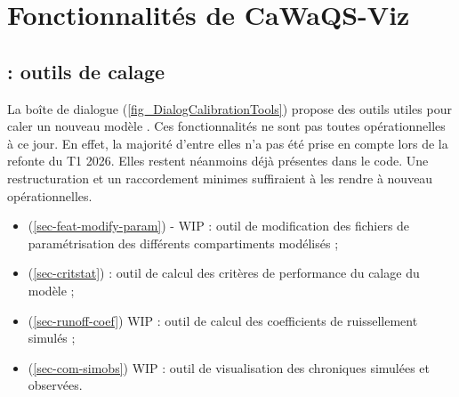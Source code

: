 \chapter{Fonctionnalités de CaWaQS-Viz}
\label{chap-features}

\renewcommand{\headrulewidth}{0.3pt}
\fancyhead[LE]{\thepage} \fancyhead[RE]{\nouppercase{\textbf{\leftmark}}}
\fancyhead[RO]{\thepage} \fancyhead[LO]{\nouppercase{\textbf{\rightmark}}}
\fancyfoot[L,C,R]{}

\setlength{\parindent}{0.35cm}

\minitoc
\newpage

\section{ : outils de calage}
\label{sec-calib-tools}

La boîte de dialogue  (\cref{fig_DialogCalibrationTools}) propose des outils utiles pour caler un nouveau modèle \cawaqs. Ces fonctionnalités ne sont pas toutes opérationnelles à ce jour. En effet, la majorité d'entre elles n'a pas été prise en compte lors de la refonte du T1 2026. Elles restent néanmoins déjà présentes dans le code. Une restructuration et un raccordement minimes suffiraient à les rendre à nouveau opérationnelles. 

\begin{itemize}
    \item  {} (\cref{sec-feat-modify-param}) - WIP : outil de modification des fichiers de paramétrisation des différents compartiments modélisés ;

    \item  {} (\cref{sec-critstat}) : outil de calcul des critères de performance du calage du modèle ;

    \item {} (\cref{sec-runoff-coef}) WIP : outil de calcul des coefficients de ruissellement simulés ;

    \item   {} (\cref{sec-com-simobs}) WIP : outil de visualisation des chroniques simulées et observées.
\end{itemize}

